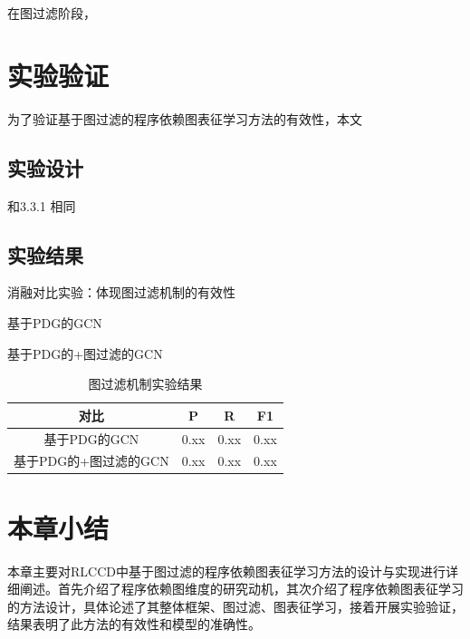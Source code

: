 在图过滤阶段，

\section{实验验证}
\label{sec:PDGExperiment}
为了验证基于图过滤的程序依赖图表征学习方法的有效性，本文
\subsection{实验设计}
\label{sec:PDGDesign}
和3.3.1 相同
\subsection{实验结果}
\label{subsec:PDGResult}
消融对比实验：体现图过滤机制的有效性

基于PDG的GCN

基于PDG的+图过滤的GCN


\begin{table}
  \centering
  \caption{图过滤机制实验结果} %
  \begin{tabular*}{0.9\textwidth}{@{\extracolsep{\fill}}cccc}
  \toprule
    对比			&P		&R		&F1 \\
  \midrule
    基于PDG的GCN			&0.xx	&0.xx		&0.xx \\
    基于PDG的+图过滤的GCN			&0.xx		&0.xx		&0.xx \\
  \bottomrule
  \end{tabular*}
\end{table}

\section{本章小结}
\label{sec:Summary5}
本章主要对RLCCD中基于图过滤的程序依赖图表征学习方法的设计与实现进行详细阐述。首先介绍了程序依赖图维度的研究动机，其次介绍了程序依赖图表征学习的方法设计，具体论述了其整体框架、图过滤、图表征学习，接着开展实验验证，结果表明了此方法的有效性和模型的准确性。



